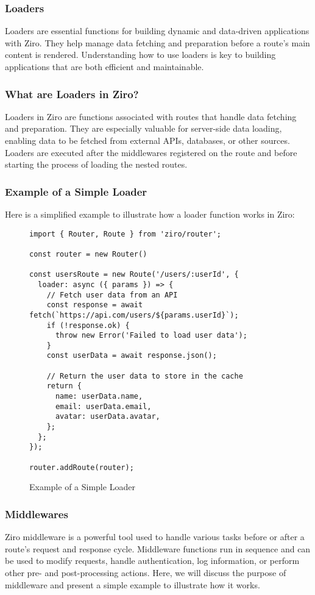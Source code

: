 \subsubsection{Loaders}
Loaders are essential functions for building dynamic and data-driven applications with Ziro. They help manage data fetching and preparation before a route’s main content is rendered. Understanding how to use loaders is key to building applications that are both efficient and maintainable.

\subsubsection*{What are Loaders in Ziro?}
Loaders in Ziro are functions associated with routes that handle data fetching and preparation. They are especially valuable for server-side data loading, enabling data to be fetched from external APIs, databases, or other sources. Loaders are executed after the middlewares registered on the route and before starting the process of loading the nested routes.

\pagebreak
\subsubsection*{Example of a Simple Loader}
Here is a simplified example to illustrate how a loader function works in Ziro:
\begin{figure}[h!]
\begin{verbatim}
import { Router, Route } from 'ziro/router';

const router = new Router()

const usersRoute = new Route('/users/:userId', {
  loader: async ({ params }) => {
    // Fetch user data from an API
    const response = await fetch(`https://api.com/users/${params.userId}`);
    if (!response.ok) {
      throw new Error('Failed to load user data');
    }
    const userData = await response.json();

    // Return the user data to store in the cache
    return {
      name: userData.name,
      email: userData.email,
      avatar: userData.avatar,
    };
  };
});

router.addRoute(router);
\end{verbatim}
\caption{Example of a Simple Loader}
\end{figure}


\subsubsection{Middlewares}
Ziro middleware is a powerful tool used to handle various tasks before or after a route's request and response cycle. Middleware functions run in sequence and can be used to modify requests, handle authentication, log information, or perform other pre- and post-processing actions. Here, we will discuss the purpose of middleware and present a simple example to illustrate how it works.

